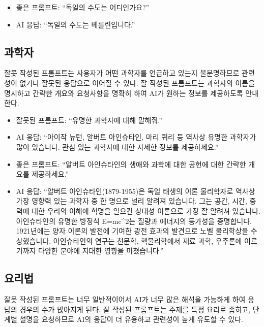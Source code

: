 \documentclass[
  letterpaper,
]{book}
\providecommand{\tightlist}{%
  \setlength{\itemsep}{0pt}\setlength{\parskip}{0pt}}\usepackage{longtable,booktabs,array}
\begin{document}
\begin{itemize}
\tightlist
\item
  좋은 프롬프트: ``독일의 수도는 어디인가요?''
\item
  AI 응답: ``독일의 수도는 베를린입니다.''
\end{itemize}

\hypertarget{uxacfcuxd559uxc790}{%
\subsection{과학자}\label{uxacfcuxd559uxc790}}

잘못 작성된 프롬프트는 사용자가 어떤 과학자를 언급하고 있는지
불분명하므로 관련성이 없거나 잘못된 응답으로 이어질 수 있다. 잘 작성된
프롬프트는 과학자의 이름을 명시하고 간략한 개요와 요청사항을 명확히 하여
AI가 원하는 정보를 제공하도록 안내한다.

\begin{itemize}
\tightlist
\item
  잘못된 프롬프트: ``유명한 과학자에 대해 말해줘.''
\item
  AI 응답: ``아이작 뉴턴, 알버트 아인슈타인, 마리 퀴리 등 역사상 유명한
  과학자가 많이 있습니다. 관심 있는 과학자에 대한 자세한 정보를
  제공하세요.''
\end{itemize}

\begin{itemize}
\tightlist
\item
  좋은 프롬프트: ``알버트 아인슈타인의 생애와 과학에 대한 공헌에 대한
  간략한 개요를 제공하세요.''
\item
  AI 응답: ``알버트 아인슈타인(1879-1955)은 독일 태생의 이론 물리학자로
  역사상 가장 영향력 있는 과학자 중 한 명으로 널리 알려져 있습니다. 그는
  공간, 시간, 중력에 대한 우리의 이해에 혁명을 일으킨 상대성 이론으로
  가장 잘 알려져 있습니다. 아인슈타인의 유명한 방정식 E=mc\^{}2는 질량과
  에너지의 등가성을 증명합니다. 1921년에는 양자 이론의 발전에 기여한
  광전 효과의 발견으로 노벨 물리학상을 수상했습니다. 아인슈타인의 연구는
  천문학, 핵물리학에서 재료 과학, 우주론에 이르기까지 다양한 분야에
  지대한 영향을 미쳤습니다.''
\end{itemize}

\hypertarget{uxc694uxb9acuxbc95}{%
\subsection{요리법}\label{uxc694uxb9acuxbc95}}

잘못 작성된 프롬프트는 너무 일반적이어서 AI가 너무 많은 해석을 가능하게
하여 응답의 경우의 수가 많아지게 된다. 잘 작성된 프롬프트는 주제를 특정
요리로 좁히고, 단계별 설명을 요청하므로 AI의 응답이 더 유용하고 관련성이
높게 유도할 수 있다.
\end{document}
